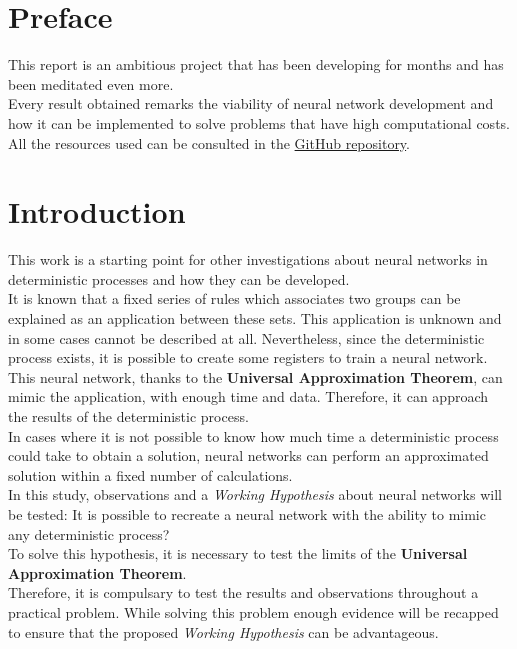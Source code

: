 \documentclass[a4paper, 11pt]{article}
\begin{document}
\tableofcontents
\listoffigures
\listoftables

\newpage
\section*{Preface}
This report is an ambitious project that has been developing for months and has been meditated even more.\\
Every result obtained remarks the viability of neural network development and how it can be implemented to solve problems that have high computational costs.\\
All the resources used can be consulted in the \href{https://github.com/Gerard-Lahuerta/TFG}{GitHub repository}.

\newpage \pagestyle{extended_plain}
\setcounter{page}{2}
\section*{Introduction}
This work is a starting point for other investigations about neural networks in deterministic processes and how they can be developed.\\
It is known that a fixed series of rules which associates two groups can be explained as an application between these sets.
This application is unknown and in some cases cannot be described at all. Nevertheless, since the deterministic process exists, it is possible to create some registers to train a neural network.\\
This neural network, thanks to the \textbf{Universal Approximation Theorem}, can mimic the application, with enough time and data. Therefore, it can approach the results of the deterministic process.\\
In cases where it is not possible to know how much time a deterministic process could take to obtain a solution, neural networks can perform an approximated solution within a fixed number of calculations.\\
In this study, observations and a \textit{Working Hypothesis} about neural networks will be tested: It is possible to recreate a neural network with the ability to mimic any deterministic process?\\ 
To solve this hypothesis, it is necessary to test the limits of the \textbf{Universal Approximation Theorem}.\\
Therefore, it is compulsary to test the results and observations throughout a practical problem. While solving this problem enough evidence will be recapped to ensure that the proposed \textit{Working Hypothesis} can be advantageous.
\end{document}
